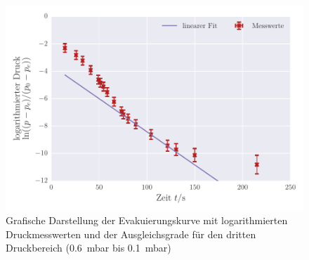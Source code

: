 \begin{figure}[!h]
 \centering
 \includegraphics[scale=.80]{../Grafiken/Evakuierungskurve_Drehschieber_log_2.pdf}
 \caption{Grafische Darstellung der Evakuierungskurve mit logarithmierten Druckmesswerten und der Ausgleichsgrade für den dritten Druckbereich (\SI{0.6}{\milli\bar} bis \SI{0.1}{\milli\bar}) \label{fig:evakuierungskurve_drehschieber_log_2}}
 \end{figure} 